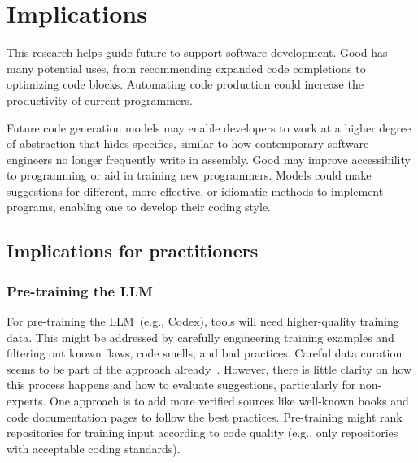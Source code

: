 \section{Implications}
\label{implications}
This research helps guide future \cct{} to support software development. 
Good \cct{} has many potential uses, from recommending expanded code completions to optimizing code blocks. Automating code production could increase the productivity of current programmers. 

Future code generation models may enable developers to work at a higher degree of abstraction that hides specifics, similar to how contemporary software engineers no longer frequently write in assembly.
Good \cct{} may improve accessibility to programming or aid in training new programmers. Models could make suggestions for different, more effective, or idiomatic methods to implement programs, enabling one to develop their coding style.

\subsection{Implications for practitioners}

\subsubsection{Pre-training the LLM}
For pre-training the LLM~(e.g., Codex), 
\AISE{} tools will need higher-quality training data. This might be addressed by carefully engineering training examples and filtering out known flaws, code smells, and bad practices. Careful data curation seems to be part of the approach already~\cite{alphacode}. However, there is little clarity on how this process happens and how to evaluate suggestions, particularly for non-experts. One approach is to add more verified sources like well-known books and code documentation pages to follow the best practices. 
Pre-training might rank repositories for training input according to code quality (e.g., only repositories with acceptable coding standards).

